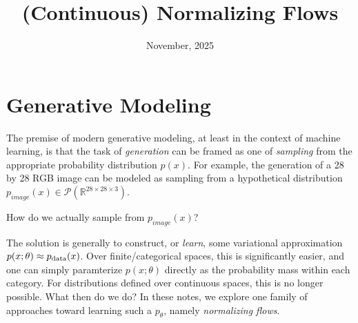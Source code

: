 \documentclass{scrartcl}
\title{(Continuous) Normalizing Flows}
\date{November, 2025}
\begin{document}
\maketitle


\section{Generative Modeling}
The premise of modern generative modeling, at least in the context of machine learning, is that the task of \textit{generation} can be framed as one of \textit{sampling} from the appropriate probability distribution $p(x)$. For example, the generation of a 28 by 28 RGB image can be modeled as sampling from a hypothetical distribution $p_{\textit{image}}(x) \in \mathcal{P}(\mathbb{R}^{28\times28\times3})$.

\begin{problembox}
How do we actually sample from  $p_{\textit{image}}(x)$?
\end{problembox}

The solution is generally to construct, or \textit{learn}, some variational approximation $p(x; \theta) \approx p_{\text{data}}(x)$. 
Over finite/categorical spaces, this is significantly easier, and one can simply paramterize $p(x; \theta)$ directly as the probability mass within each category. For distributions defined over continuous spaces, this is no longer possible. What then do we do? In these notes, we explore one family of approaches toward learning such a $p_\theta$, namely \textit{normalizing flows}.
\end{document}
